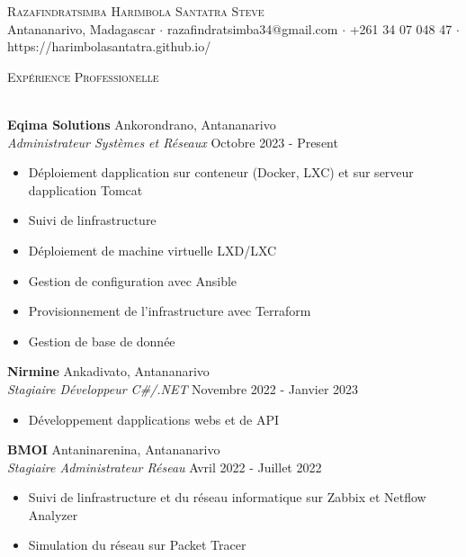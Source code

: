 \documentclass[a4paper]{article}
\newcommand{\lineunder} {
    \vspace*{-8pt} \\
    \hspace*{-18pt} \hrulefill \\
}
\newcommand{\header} [1] {
    {\hspace*{-18pt}\vspace*{6pt} \textsc{#1}}
    \vspace*{-6pt} \lineunder
}
\begin{document}
\vspace*{-40pt}

    

\vspace*{-10pt}
\begin{center}
	{\Huge \scshape {Razafindratsimba Harimbola Santatra Steve}}\\
	Antananarivo, Madagascar $\cdot$ razafindratsimba34@gmail.com $\cdot$ +261 34 07 048 47 $\cdot$ https://harimbolasantatra.github.io/\\
\end{center}

\header{Expérience Professionelle}
\vspace{1mm}

\textbf{Eqima Solutions} \hfill Ankorondrano, Antananarivo\\
\textit{Administrateur Systèmes et Réseaux} \hfill Octobre 2023 - Present\\
\vspace{-1mm}
\begin{itemize} \itemsep 1pt
	\item Déploiement d\textquotesingle{}application sur conteneur (Docker, LXC) et sur serveur d\textquotesingle{}application Tomcat
	\item Suivi de l\textquotesingle{}infrastructure
	\item Déploiement de machine virtuelle LXD/LXC
	\item Gestion de configuration avec Ansible
	\item Provisionnement de l’infrastructure avec Terraform
	\item Gestion de base de donnée
\end{itemize}
\textbf{Nirmine} \hfill Ankadivato, Antananarivo\\
\textit{Stagiaire Développeur C\#/.NET} \hfill Novembre 2022 - Janvier 2023\\
\vspace{-1mm}
\begin{itemize} \itemsep 1pt
	\item Développement d\textquotesingle{}applications webs et de API
\end{itemize}
\textbf{BMOI} \hfill Antaninarenina, Antananarivo\\
\textit{Stagiaire Administrateur Réseau} \hfill Avril 2022 - Juillet 2022\\
\vspace{-1mm}
\begin{itemize} \itemsep 1pt
	\item Suivi de l\textquotesingle{}infrastructure et du réseau informatique sur Zabbix et Netflow Analyzer
	\item Simulation du réseau sur Packet Tracer
\end{itemize}
\end{document}
